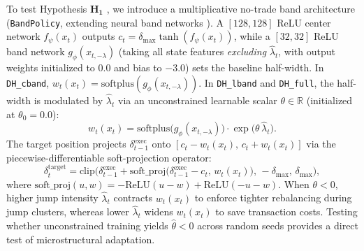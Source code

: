 \documentclass[11pt,a4paper]{article}
\begin{document}
To test Hypothesis $\mathbf{H_1}$ \citep{Whalley1997,Imaki2023}, we introduce a multiplicative no-trade band architecture (\texttt{BandPolicy}, extending neural band networks \citealt{Imaki2023,Babaei2024}). A $[128, 128]$ ReLU center network $f_\psi(x_t)$ outputs $c_t = \delta_{\max}\tanh(f_\psi(x_t))$, while a $[32, 32]$ ReLU band network $g_\phi(x_{t,-\lambda})$ (taking all state features \emph{excluding} $\hat{\lambda}_t$, with output weights initialized to $0.0$ and bias to $-3.0$) sets the baseline half-width. In \texttt{DH\_cband}, $w_t(x_t) = \text{softplus}(g_\phi(x_{t,-\lambda}))$. In \texttt{DH\_lband} and \texttt{DH\_full}, the half-width is modulated by $\hat{\lambda}_t$ via an unconstrained learnable scalar $\theta \in \mathbb{R}$ (initialized at $\theta_0 = 0.0$):
\begin{equation}
  w_t(x_t) = \text{softplus}\big(g_\phi(x_{t,-\lambda})\big)\cdot \exp\big(\theta\,\hat{\lambda}_t\big).
  \label{eq:band_width}
\end{equation}
The target position projects $\delta_{t-1}^{\text{exec}}$ onto $[c_t - w_t(x_t),\, c_t + w_t(x_t)]$ via the piecewise-differentiable soft-projection operator:
\begin{equation}
  \delta_t^{\text{target}} = \text{clip}\Big(\delta_{t-1}^{\text{exec}} + \text{soft\_proj}\big(\delta_{t-1}^{\text{exec}} - c_t,\, w_t(x_t)\big),\, -\delta_{\max},\, \delta_{\max}\Big),
  \label{eq:soft_proj}
\end{equation}
where $\text{soft\_proj}(u, w) = -\text{ReLU}(u - w) + \text{ReLU}(-u - w)$. When $\theta < 0$, higher jump intensity $\hat{\lambda}_t$ contracts $w_t(x_t)$ to enforce tighter rebalancing during jump clusters, whereas lower $\hat{\lambda}_t$ widens $w_t(x_t)$ to save transaction costs. Testing whether unconstrained training yields $\hat{\theta} < 0$ across random seeds provides a direct test of microstructural adaptation.
\end{document}
